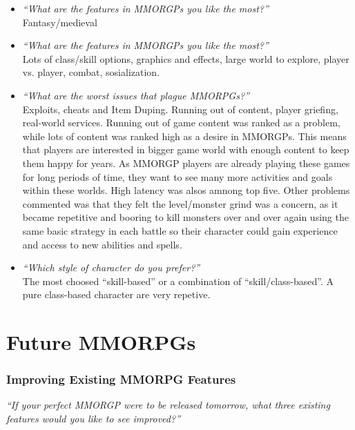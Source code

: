       \begin{itemize}
        \item {\it ``What are the features in MMORGPs you like the most?''} \\
        Fantasy/medieval
        \item {\it ``What are the features in MMORGPs you like the most?''} \\
        Lots of class/skill options, graphics and effects, large world to explore, player vs. player, combat, sosialization.
        \item {\it ``What are the worst issues that plague MMORPGs?''} \\
        Exploits, cheats and Item Duping. Running out of content, player griefing, real-world services. Running out of game content was ranked as a problem, while lots of content was ranked high as a desire in MMORGPs. This means that players are interested in bigger game world with enough content to keep them happy for years. As MMORGP players are already playing these games for long periods of time, they want to see many more activities and goals within these worlds. High latency was alsos amnong top five. Other problems commented was that they felt the level/monster grind was a concern, as it became repetitive and booring to kill monsters over and over again using the same basic strategy in each battle so their character could gain experience and access to new abilities and spells. 
        \item {\it ``Which style of character do you prefer?''} \\
        The most choosed ``skill-based'' or a combination of ``skill/class-based''. A pure class-based character are very repetive. 
      \end{itemize}


  \section*{Future MMORPGs}
      
    \subsubsection*{Improving Existing MMORPG Features}

      {\it ``If your perfect MMORGP were to be released tomorrow, what three existing features would you like to see improved?''}

